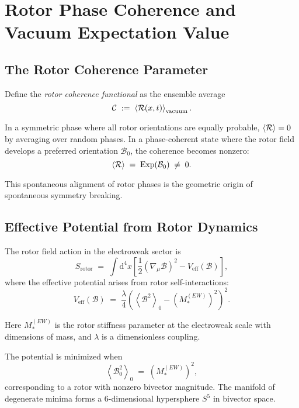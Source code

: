 \documentclass[11pt,a4paper]{article}
\newcommand{\grade}[2]{\left\langle #1 \right\rangle_{#2}}
\newcommand{\scal}[1]{\grade{#1}{0}}
\newcommand{\Exp}{\operatorname{Exp}}
\newcommand{\Rotor}{\mathcal{R}}
\newcommand{\Biv}{\mathcal{B}}
\newcommand{\D}{\nabla}                        %
\theoremstyle{definition}
\theoremstyle{plain}
\theoremstyle{remark}
\begin{document}
\vspace{1em}

\section{Rotor Phase Coherence and Vacuum Expectation Value}\label{sec:coherence-vev}

\subsection{The Rotor Coherence Parameter}

Define the \emph{rotor coherence functional} as the ensemble average
\begin{equation}
  \mathcal{C} \;:=\; \ev{\Rotor(x,t)}_{\text{vacuum}}.
  \label{eq:coherence}
\end{equation}

In a symmetric phase where all rotor orientations are equally probable, $\ev{\Rotor} = 0$ by averaging over random phases. In a phase-coherent state where the rotor field develops a preferred orientation $\Biv_0$, the coherence becomes nonzero:
\begin{equation}
  \ev{\Rotor} \;=\; \Exp(\Biv_0) \;\neq\; 0.
\end{equation}

This spontaneous alignment of rotor phases is the geometric origin of spontaneous symmetry breaking.

\subsection{Effective Potential from Rotor Dynamics}

The rotor field action in the electroweak sector is
\begin{equation}
  S_{\text{rotor}} \;=\; \int \mathrm{d}^4x \left[\frac{1}{2}(\D_\mu\Biv)^2 - V_{\text{eff}}(\Biv)\right],
  \label{eq:rotor-action}
\end{equation}
where the effective potential arises from rotor self-interactions:
\begin{equation}
  V_{\text{eff}}(\Biv) \;=\; \frac{\lambda}{4}\left(\scal{\Biv^2} - (M_*^{(EW)})^2\right)^2.
  \label{eq:rotor-potential}
\end{equation}

Here $M_*^{(EW)}$ is the rotor stiffness parameter at the electroweak scale with dimensions of mass, and $\lambda$ is a dimensionless coupling.

The potential is minimized when
\begin{equation}
  \scal{\Biv_0^2} \;=\; (M_*^{(EW)})^2,
  \label{eq:biv-minimum}
\end{equation}
corresponding to a rotor with nonzero bivector magnitude. The manifold of degenerate minima forms a 6-dimensional hypersphere $S^5$ in bivector space.
\end{document}
